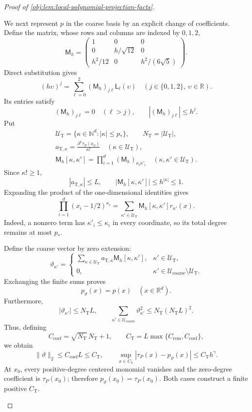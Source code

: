 \begin{proof}[Proof of \cref{obj:lem:local-polynomial-projection-facts}]
\begin{enumerate}
We next represent \(p\) in the coarse basis by an explicit change of coefficients.
Define the matrix, whose rows and columns are indexed by \(0,1,2\),
\[
\mathsf M_h=
\begin{pmatrix}
1&0&0\\
0&h/\sqrt{12}&0\\
h^2/12&0&h^2/(6\sqrt5)
\end{pmatrix}.
\]
Direct substitution gives
\[
(h\upsilon)^j
 =\sum_{\ell=0}^2(\mathsf M_h)_{j\ell}\mathsf L_\ell(\upsilon)
 \quad(j\in\{0,1,2\},\ \upsilon\in\mathbb R).
\]
Its entries satisfy
\[
(\mathsf M_h)_{j\ell}=0\quad(\ell>j),
\qquad
|(\mathsf M_h)_{j\ell}|\le h^j.
\]
Put
\[
\begin{gathered}
\mathcal U_{\mathrm T}
 =\{\kappa\in\mathbb N^d:|\kappa|\le p_*\},
\qquad
N_{\mathrm T}=|\mathcal U_{\mathrm T}|,\\
a_{\mathrm T,\kappa}
 =\frac{\partial^\kappa\tau_P(x_0)}{\kappa!}
 \quad(\kappa\in\mathcal U_{\mathrm T}),\\
\mathsf M_h[\kappa,\kappa']
 =\prod_{i=1}^d(\mathsf M_h)_{\kappa_i\kappa'_i}
 \quad(\kappa,\kappa'\in\mathcal U_{\mathrm T}).
\end{gathered}
\]
Since \(\kappa!\ge1\),
\[
|a_{\mathrm T,\kappa}|\le L,
\qquad
|\mathsf M_h[\kappa,\kappa']|
 \le h^{|\kappa|}\le1.
\]
Expanding the product of the one-dimensional identities gives
\[
\prod_{i=1}^d(x_i-1/2)^{\kappa_i}
 =\sum_{\kappa'\in\mathcal U_{\mathrm T}}
   \mathsf M_h[\kappa,\kappa']r_{\kappa'}(x).
\]
Indeed, a nonzero term has \(\kappa'_i\le\kappa_i\) in every coordinate,
so its total degree remains at most \(p_*\).

Define the coarse vector by zero extension:
\[
\vartheta_{\kappa'}=
\begin{cases}
\displaystyle\sum_{\kappa\in\mathcal U_{\mathrm T}}
 a_{\mathrm T,\kappa}\mathsf M_h[\kappa,\kappa'],
 &\kappa'\in\mathcal U_{\mathrm T},\\
0,&\kappa'\in\mathcal U_{\mathrm{coarse}}\setminus\mathcal U_{\mathrm T}.
\end{cases}
\]
Exchanging the finite sums proves
\[
p_\vartheta(x)=p(x)\quad(x\in\mathbb R^d).
\]
Furthermore,
\[
|\vartheta_{\kappa'}|\le N_{\mathrm T}L,
\qquad
\sum_{\kappa'\in\mathcal U_{\mathrm{coarse}}}
 \vartheta_{\kappa'}^2
 \le N_{\mathrm T}(N_{\mathrm T}L)^2.
\]
Thus, defining
\[
C_{\mathrm{coef}}=\sqrt{N_{\mathrm T}}\,N_{\mathrm T}+1,
\qquad
C_{\mathrm T}=L\max\{C_{\mathrm{rem}},C_{\mathrm{coef}}\},
\]
we obtain
\[
\|\vartheta\|_2\le C_{\mathrm{coef}}L\le C_{\mathrm T},
\qquad
\sup_{x\in C_h}|\tau_P(x)-p_\vartheta(x)|
 \le C_{\mathrm T}h^\gamma.
\]
At \(x_0\), every positive-degree centered monomial vanishes and the
zero-degree coefficient is \(\tau_P(x_0)\); therefore
\(p_\vartheta(x_0)=\tau_P(x_0)\).
Both cases construct a finite positive \(C_{\mathrm T}\).


\end{enumerate}
\end{proof}

